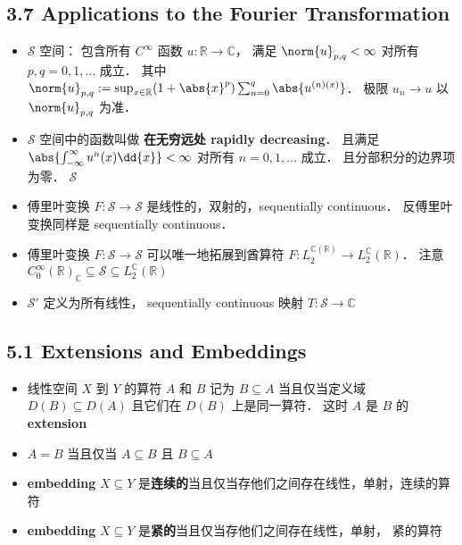 \subsection{3.7 Applications to the Fourier Transformation}
\begin{itemize}
\item $\mathcal S$ 空间： 包含所有 $C^\infty$ 函数 $u: \mathbb R \to \mathbb C$， 满足 $\norm{u}_{p,q} < \infty$ 对所有 $p, q=0,1,\dots$ 成立． 其中 $\norm{u}_{p,q} := \sup_{x\in\mathbb R} (1+\abs{x}^p) \sum_{n=0}^q\abs{u^{(n)(x)}}$． 极限 $u_n \to u$ 以 $\norm{u}_{p,q}$ 为准．

\item $\mathcal S$ 空间中的函数叫做 \textbf{在无穷远处 rapidly decreasing}． 且满足 $\abs{\int_{-\infty}^\infty u^{n}(x) \dd{x}} < \infty$ 对所有 $n = 0, 1,\dots$ 成立． 且分部积分的边界项为零． $\mathcal S$ 

\item 傅里叶变换 $F:\mathcal S\to\mathcal S$ 是线性的，双射的，sequentially continuous． 反傅里叶变换同样是 sequentially continuous．

\item 傅里叶变换 $F:\mathcal S\to\mathcal S$ 可以唯一地拓展到酋算符 $F: L_2^{\mathbb C(\mathbb R)} \to L_2^{\mathbb C}(\mathbb R)$． 注意 $C_0^\infty(\mathbb R)_{\mathbb C} \subseteq \mathcal S \subseteq L_2^{\mathbb C}(\mathbb R)$

\item $\mathcal S'$ 定义为所有线性， sequentially continuous 映射 $T: \mathcal S\to \mathbb C$
\end{itemize}

\subsection{5.1 Extensions and Embeddings}
\begin{itemize}
\item 线性空间 $X$ 到 $Y$ 的算符 $A$ 和 $B$ 记为 $B \subseteq A$ 当且仅当定义域 $D(B) \subseteq D(A)$ 且它们在 $D(B)$ 上是同一算符． 这时 $A$ 是 $B$ 的 \textbf{extension}

\item $A = B$ 当且仅当 $A\subseteq B$ 且 $B\subseteq A$

\item \textbf{embedding} $X \subseteq Y$ 是\textbf{连续的}当且仅当存他们之间存在线性，单射，连续的算符

\item \textbf{embedding} $X \subseteq Y$ 是\textbf{紧的}当且仅当存他们之间存在线性，单射， 紧的算符
\end{itemize}


